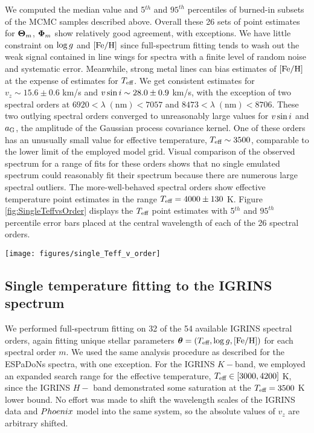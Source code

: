 \documentclass[twocolumn]{emulateapj}%
\begin{document}
We computed the median value and 5$^{th}$ and $95^{th}$ percentiles of burned-in subsets of the MCMC samples described above.  Overall these 26 sets of point estimates for ${\bm \Theta}_{m}$, ${\bm \Phi}_m$ show relatively good agreement, with exceptions.  We have little constraint on $\log g$ and $[{\rm Fe}/{\rm H}]$ since full-spectrum fitting tends to wash out the weak signal contained in line wings for spectra with a finite level of random noise and systematic error.  Meanwhile, strong metal lines can bias estimates of $[{\rm Fe}/{\rm H}]$ at the expense of estimates for $T_\textrm{eff}$.  We get consistent estimates for $v_z \sim 15.6 \pm 0.6$ km/s and $v \sin i \sim 28.0 \pm 0.9$ km/s, with the exception of two spectral orders at $6920 <\lambda \;(\mathrm{nm})< 7057$ and $8473 < \lambda \;(\mathrm{nm}) < 8706$.  These two outlying spectral orders converged to unreasonably large values for $v \sin i$ and $a_{\rm G}$, the amplitude of the Gaussian process covariance kernel.  One of these orders has an unusually small value for effective temperature, $T_\textrm{eff}\sim3500$, comparable to the lower limit of the employed model grid.  Visual comparison of the observed spectrum for a range of fits for these orders shows that no single emulated spectrum could reasonably fit their spectrum because there are numerous large spectral outliers.  The more-well-behaved spectral orders show effective temperature point estimates in the range $T_\textrm{eff}=4000\pm130$ K.  Figure \ref{fig:SingleTeffvsOrder} displays the $T_\textrm{eff}$ point estimates with 5$^{th}$ and $95^{th}$ percentile error bars placed at the central wavelength of each of the 26 spectral orders.

\begin{figure*}
	\centering
	\texttt{[image: figures/single\_Teff\_v\_order]}
	\caption{Effective temperature as derived from unique full spectrum fitting to each of 58 spectral orders in the optical through infrared portions of the spectrum assuming a single component photosphere.  }
	\label{fig:SingleTeffvsOrder}
\end{figure*}

\subsection{Single temperature fitting to the IGRINS spectrum}

We performed full-spectrum fitting on 32 of the 54 available IGRINS spectral orders, again fitting unique stellar parameters ${\bm \theta} = (T_\textrm{eff}, \log g, [{\rm Fe}/{\rm H}])$ for each spectral order $m$.  We used the same analysis procedure as described for the ESPaDoNs spectra, with one exception.  For the IGRINS $K-$band, we employed an expanded search range for the effective temperature, $T_\textrm{eff} \in [3000, 4200]$ K, since the IGRINS $H-$ band demonstrated some saturation at the $T_\textrm{eff}=3500$ K lower bound.  No effort was made to shift the wavelength scales of the IGRINS data and ${\sc Phoenix}$ model into the same system, so the absolute values of $v_z$ are arbitrary shifted.
\end{document}
